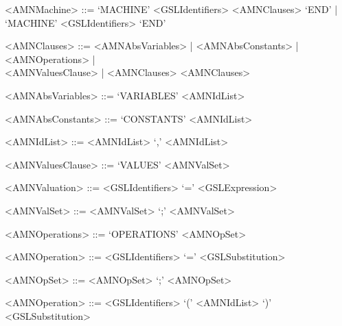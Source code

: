 \documentclass[a4paper,openany]{book}
\begin{document}
%
\begin{grammar}
<AMNMachine> ::= `MACHINE' <GSLIdentifiers> <AMNClauses> `END'  | `MACHINE' <GSLIdentifiers> `END'  

<AMNClauses> ::=  <AMNAbsVariables> | <AMNAbsConstants> | <AMNOperations> | \\ <AMNValuesClause> | <AMNClauses> <AMNClauses>

<AMNAbsVariables> ::= `VARIABLES' <AMNIdList>

<AMNAbsConstants> ::= `CONSTANTS' <AMNIdList> 

<AMNIdList> ::= <AMNIdList> `,' <AMNIdList>

<AMNValuesClause> ::= `VALUES' <AMNValSet>

<AMNValuation> ::= <GSLIdentifiers> `=' <GSLExpression>

<AMNValSet> ::= <AMNValSet> `;' <AMNValSet>

<AMNOperations> ::= `OPERATIONS' <AMNOpSet>

<AMNOperation> ::= <GSLIdentifiers> `='  <GSLSubstitution>

<AMNOpSet> ::= <AMNOpSet> `;' <AMNOpSet>

<AMNOperation> ::= <GSLIdentifiers> `(' <AMNIdList> `)' <GSLSubstitution> 
\end{grammar}
\end{document}
